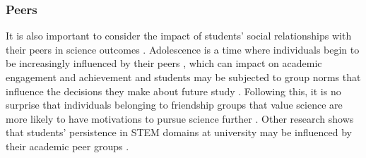 \subsubsection*{Peers}
It is also important to consider the impact of students' social relationships with their peers in science outcomes \citep{osborne2003attitudes}. Adolescence is a time where individuals begin to be increasingly influenced by their peers \citep{douvan1966adolescent}, which can impact on academic engagement and achievement \citep{ryan2000peer} and students may be subjected to group norms that influence the decisions they make about future study \citep{brown1986perceptions}. Following this, it is no surprise that individuals belonging to friendship groups that value science are more likely to have motivations to pursue science further \citep{robnett2013friendship}. Other research shows that students' persistence in STEM domains at university may be influenced by their academic peer groups \citep{Ost_2010}.

